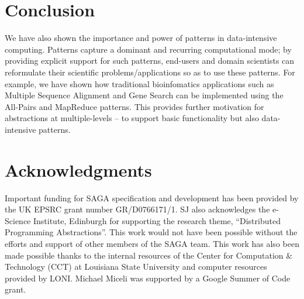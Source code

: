 \documentclass[conference,final]{IEEEtran}
\newcommand{\jhanote}[1]{ {\textcolor{red} { ***SJ: #1 }}}
\newcommand{\jhanote}[1]{}
\begin{document}
\section{Conclusion}

We have also shown the importance and power of patterns in
data-intensive computing. Patterns capture a dominant and recurring
computational mode; by providing explicit support for such patterns,
end-users and domain scientists can reformulate their scientific
problems/applications so as to use these patterns. For example, we
have shown how traditional bioinfomatics applications such as Multiple
Sequence Alignment and Gene Search can be implemented using the
All-Pairs and MapReduce patterns. This provides further motivation for
abstractions at multiple-levels -- to support basic functionality but
also data-intensive patterns.





\section{Acknowledgments}

Important funding for SAGA specification and development has been
provided by the UK EPSRC grant number GR/D0766171/1.  SJ also
acknowledges the e-Science Institute, Edinburgh for supporting the
research theme, ``Distributed Programming Abstractions''.  This work
would not have been possible without the efforts and support of other
members of the SAGA team. This work has also been made possible thanks
to the internal resources of the Center for Computation \& Technology
(CCT) at Louisiana State University and computer resources provided by
LONI. Michael Miceli was supported by a Google Summer of Code grant.
 
\end{document}
